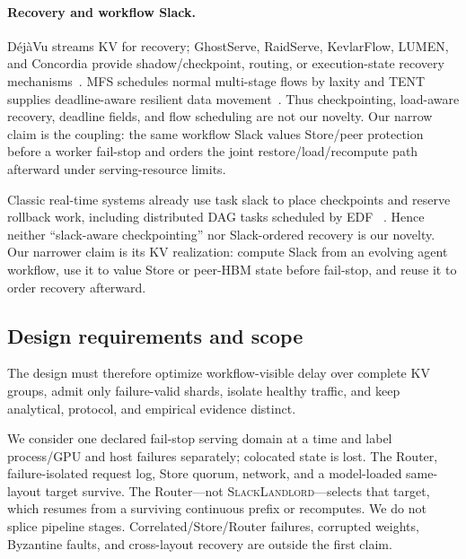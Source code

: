 \paragraph{Recovery and workflow Slack.}
D\'ej\`aVu streams KV for recovery; GhostServe, RaidServe, KevlarFlow, LUMEN,
and Concordia provide shadow/checkpoint, routing, or execution-state recovery
mechanisms~\cite{strati2024dejavu,jayakody2026ghostserve,xu2026raidserve,
qian2026kevlarflow,cao2026lumen,gan2026concordia}.  MFS schedules normal
multi-stage flows by laxity and TENT supplies deadline-aware resilient data
movement~\cite{sun2026mfs,ren2026tent}.  Thus checkpointing, load-aware
recovery, deadline fields, and flow scheduling are not our novelty.  Our
narrow claim is the coupling: the same workflow Slack values Store/peer
protection before a worker fail-stop and orders the joint
restore/load/recompute path afterward under serving-resource limits.

Classic real-time systems already use task slack to place checkpoints and
reserve rollback work, including distributed DAG tasks scheduled by EDF
~\cite{melhem2004interplay,acharya2008dynamic}.  Hence neither ``slack-aware
checkpointing'' nor Slack-ordered recovery is our novelty.  Our narrower claim
is its KV realization: compute Slack from an evolving agent workflow, use it to
value Store or peer-HBM state before fail-stop, and reuse it to order recovery
afterward.


\subsection{Design requirements and scope}

The design must therefore optimize workflow-visible delay over complete KV
groups, admit only failure-valid shards, isolate healthy traffic, and keep
analytical, protocol, and empirical evidence distinct.

We consider one declared fail-stop serving domain at a time and label
process/GPU and host failures separately; colocated state is lost.  The Router,
failure-isolated request log, Store quorum, network, and a model-loaded
same-layout target survive.  The Router---not \textsc{SlackLandlord}---selects that target,
which resumes from a surviving continuous prefix or recomputes.  We do not
splice pipeline stages.  Correlated/Store/Router failures, corrupted weights,
Byzantine faults, and cross-layout recovery are outside the first claim.
